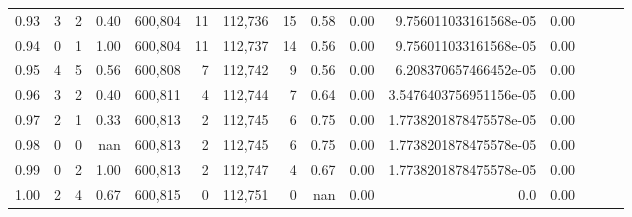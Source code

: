\begin{tabular}{rrrrrrrrrrrrrrr}
0.93 &       3 &      2 &  0.40 &  600,804 &       11 &  112,736 &       15 &  0.58 &  0.00 &   9.756011033161568e-05 &      0.00 \\
0.94 &       0 &      1 &  1.00 &  600,804 &       11 &  112,737 &       14 &  0.56 &  0.00 &   9.756011033161568e-05 &      0.00 \\
0.95 &       4 &      5 &  0.56 &  600,808 &        7 &  112,742 &        9 &  0.56 &  0.00 &   6.208370657466452e-05 &      0.00 \\
0.96 &       3 &      2 &  0.40 &  600,811 &        4 &  112,744 &        7 &  0.64 &  0.00 &  3.5476403756951156e-05 &      0.00 \\
0.97 &       2 &      1 &  0.33 &  600,813 &        2 &  112,745 &        6 &  0.75 &  0.00 &  1.7738201878475578e-05 &      0.00 \\
0.98 &       0 &      0 &   nan &  600,813 &        2 &  112,745 &        6 &  0.75 &  0.00 &  1.7738201878475578e-05 &      0.00 \\
0.99 &       0 &      2 &  1.00 &  600,813 &        2 &  112,747 &        4 &  0.67 &  0.00 &  1.7738201878475578e-05 &      0.00 \\
1.00 &       2 &      4 &  0.67 &  600,815 &        0 &  112,751 &        0 &   nan &  0.00 &                     0.0 &      0.00 \\
\bottomrule
\end{tabular}
